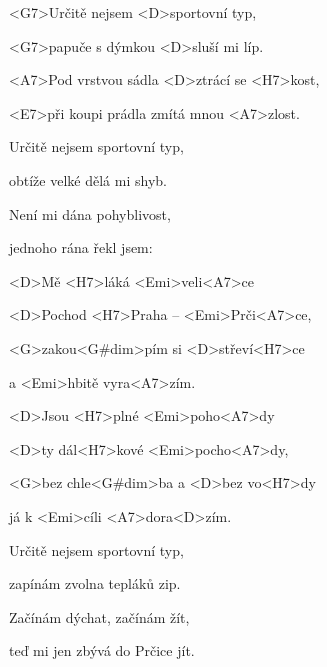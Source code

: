 

\zs
<G7>Určitě nejsem <D>sportovní typ,

<G7>papuče s dýmkou <D>sluší mi líp.

<A7>Pod vrstvou sádla <D>ztrácí se <H7>kost,

<E7>při koupi prádla zmítá mnou <A7>zlost.
\ks

\zs
Určitě nejsem sportovní typ,

obtíže velké dělá mi shyb.

Není mi dána pohyblivost,

jednoho rána řekl jsem: 
\ks

\zr
<D>Mě <H7>láká <Emi>veli<A7>ce

<D>Pochod <H7>Praha – <Emi>Prči<A7>ce,

<G>zakou<G#dim>pím si <D>střeví<H7>ce

a <Emi>hbitě vyra<A7>zím.

<D>Jsou <H7>plné <Emi>poho<A7>dy

<D>ty dál<H7>kové <Emi>pocho<A7>dy,

<G>bez chle<G#dim>ba a <D>bez vo<H7>dy

já k <Emi>cíli <A7>dora<D>zím.
\kr

\zs
Určitě nejsem sportovní typ,

zapínám zvolna tepláků zip.

Začínám dýchat, začínám žít,

teď mi jen zbývá do Prčice jít.
\ks

\zr
\kr

\kp
